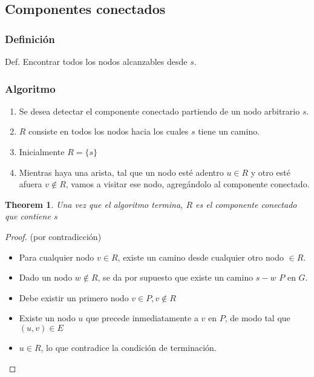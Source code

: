 \documentclass[12pt, fleqn]{article}
\newtheorem{theorem}{Theorem}[section]
\begin{document}
        \subsection{Componentes conectados}
            \subsubsection{Definición}    
                Def. Encontrar todos los nodos alcanzables desde $s$.
            \subsubsection{Algoritmo}
                \begin{enumerate}
                    \item Se desea detectar el componente conectado partiendo de un nodo arbitrario $s$.
                    \item $R$ consiste en todos los nodos hacia los cuales $s$ tiene un camino.
                    \item Inicialmente $R = \{s\}$
                    \item Mientras haya una arista, tal que un nodo esté adentro $u \in R$ y otro esté afuera $v \notin R$,
                        vamos a visitar ese nodo, agregándolo al componente conectado.
                \end{enumerate}    
            \begin{theorem}
                Una vez que el algoritmo termina, $R$ es el componente conectado que contiene $s$
            \end{theorem}
            \begin{proof}
                (por contradicción)
                \begin{itemize}
                    \item  Para cualquier nodo $v \in R$, existe un camino desde cualquier otro nodo $\in R$.
                    \item Dado un nodo $w \notin R$, se da por supuesto  que existe un camino $s-w$ $P$ en $G$.
                    \item Debe existir un primero nodo $v \in P, v \notin R$
                    \item Existe un nodo $u$ que precede inmediatamente a $v$ en $P$, de modo tal que $(u,v) \in E$
                    \item $u \in R$, lo que contradice la condición de terminación.  
                \end{itemize}
            \end{proof}
\end{document}
